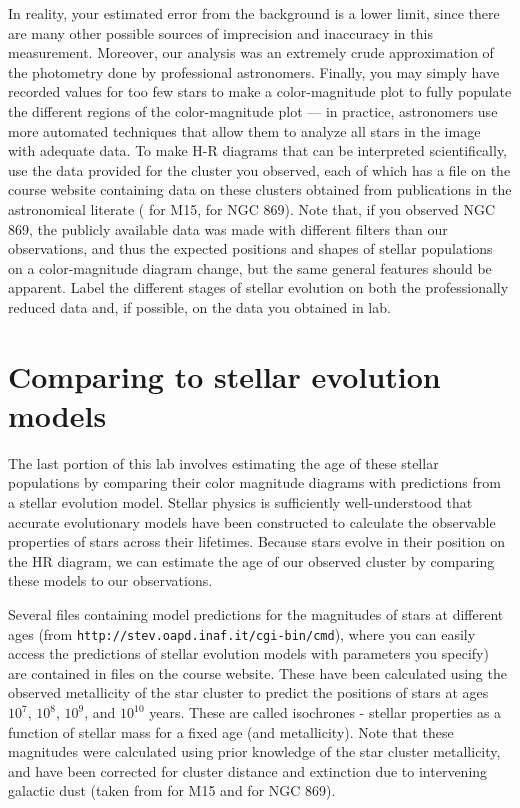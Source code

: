 In reality, your estimated error from the background is a lower limit, since there are many other possible sources of imprecision and inaccuracy in this measurement. Moreover, our analysis was an extremely crude approximation of the photometry done by professional astronomers. Finally, you may simply have recorded values for too few stars to make a color-magnitude plot to fully populate the different regions of the color-magnitude plot --- in practice, astronomers use more automated techniques that allow them to analyze all stars in the image with adequate data. To make H-R diagrams that can be interpreted scientifically, use the data provided for the cluster you observed, each of which has a file on the course website containing data on these clusters obtained from publications in the astronomical literate (\cite{An2008} for M15, \cite{Slesnick2002} for NGC 869). Note that, if you observed NGC 869, the publicly available data was made with different filters than our observations, and thus the expected positions and shapes of stellar populations on a color-magnitude diagram change, but the same general features should be apparent. Label the different stages of stellar evolution on both the professionally reduced data and, if possible, on the data you obtained in lab.   

\section{Comparing to stellar evolution models}

The last portion of this lab involves estimating the age of these stellar populations by comparing their color magnitude diagrams with predictions from a stellar evolution model. Stellar physics is sufficiently well-understood that accurate evolutionary models have been constructed to calculate the observable properties of stars across their lifetimes. Because stars evolve in their position on the HR diagram, we can estimate the age of our observed cluster by comparing these models to our observations.

Several files containing model predictions for the magnitudes of stars at different ages (from \texttt{http://stev.oapd.inaf.it/cgi-bin/cmd}), where you can easily access the predictions of stellar evolution models with parameters you specify) are contained in files on the course website. These have been calculated using the observed metallicity of the star cluster to predict the positions of stars at ages $10^7$, $10^8$, $10^9$, and $10^{10}$ years. These are called isochrones - stellar properties as a function of stellar mass for a fixed age (and metallicity). Note that these magnitudes were calculated using prior knowledge of the star cluster metallicity, and have been corrected for cluster distance and extinction due to intervening galactic dust (taken from \cite{DurrellHarris1993} for M15 and \cite{Currie2010} for NGC 869).

